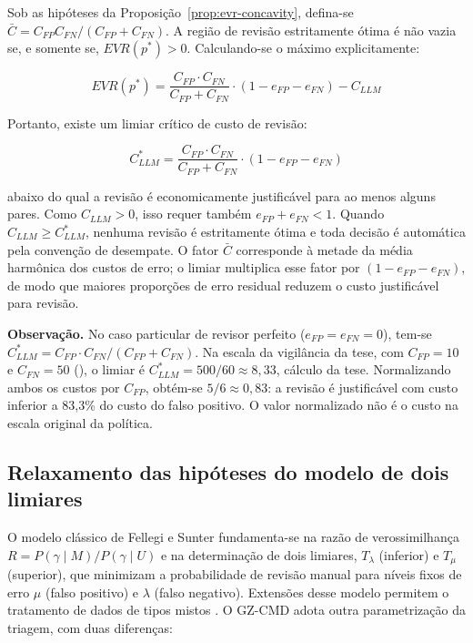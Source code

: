 \begin{corollary}
\label{cor:cllm-critical}
Sob as hipóteses da Proposição~\ref{prop:evr-concavity}, defina-se $\bar C=C_{FP}C_{FN}/(C_{FP}+C_{FN})$. A região de revisão estritamente ótima é não vazia se, e somente se, $EVR(p^*) > 0$. Calculando-se o máximo explicitamente:

\[
EVR(p^*) = \frac{C_{FP} \cdot C_{FN}}{C_{FP} + C_{FN}} \cdot (1 - e_{FP} - e_{FN}) - C_{LLM}
\]

Portanto, existe um limiar crítico de custo de revisão:

\[
C_{LLM}^* = \frac{C_{FP} \cdot C_{FN}}{C_{FP} + C_{FN}} \cdot (1 - e_{FP} - e_{FN})
\]

abaixo do qual a revisão é economicamente justificável para ao menos alguns pares. Como $C_{LLM}>0$, isso requer também $e_{FP}+e_{FN}<1$. Quando $C_{LLM} \ge C_{LLM}^*$, nenhuma revisão é estritamente ótima e toda decisão é automática pela convenção de desempate. O fator $\bar C$ corresponde à metade da média harmônica dos custos de erro; o limiar multiplica esse fator por $(1-e_{FP}-e_{FN})$, de modo que maiores proporções de erro residual reduzem o custo justificável para revisão.
\end{corollary}

\textbf{Observação.} No caso particular de revisor perfeito ($e_{FP} = e_{FN} = 0$), tem-se $C_{LLM}^* = C_{FP} \cdot C_{FN} / (C_{FP} + C_{FN})$. Na escala da vigilância da tese, com $C_{FP}=10$ e $C_{FN}=50$ (), o limiar é $C_{LLM}^*=500/60\approx8{,}33$, cálculo da tese. Normalizando ambos os custos por $C_{FP}$, obtém-se $5/6\approx0{,}83$: a revisão é justificável com custo inferior a 83,3\% do custo do falso positivo. O valor normalizado não é o custo na escala original da política.

\subsection{Relaxamento das hipóteses do modelo de dois limiares}

O modelo clássico de Fellegi e Sunter \cite{Fellegi1969theory} fundamenta-se na razão de verossimilhança $R = P(\gamma\mid M) / P(\gamma\mid U)$ e na determinação de dois limiares, $T_\lambda$ (inferior) e $T_\mu$ (superior), que minimizam a probabilidade de revisão manual para níveis fixos de erro $\mu$ (falso positivo) e $\lambda$ (falso negativo). Extensões desse modelo permitem o tratamento de dados de tipos mistos \cite{Vo2023extending}. O GZ-CMD adota outra parametrização da triagem, com duas diferenças:

